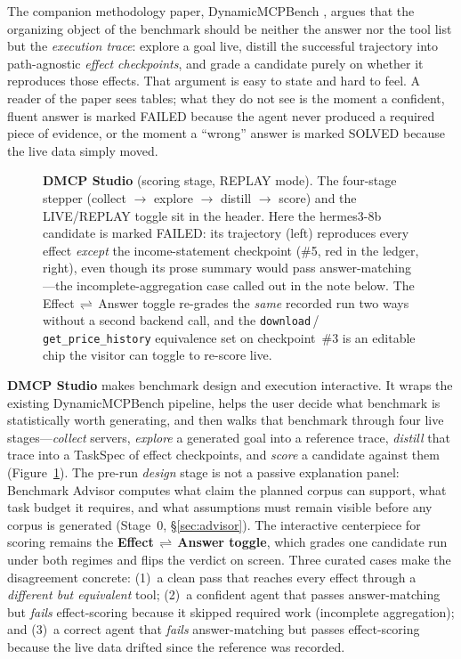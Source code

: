 \documentclass[11pt]{article}
\begin{document}
The companion methodology paper, DynamicMCPBench
\citep{dynamicmcpbench2026}, argues that the organizing object of the
benchmark should be neither the answer nor the tool list but the
\emph{execution trace}: explore a goal live, distill the successful
trajectory into path-agnostic \emph{effect checkpoints}, and grade a
candidate purely on whether it reproduces those effects. That argument is
easy to state and hard to feel. A reader of the paper sees tables; what they
do not see is the moment a confident, fluent answer is marked
\textsf{FAILED} because the agent never produced a required piece of
evidence, or the moment a ``wrong'' answer is marked \textsf{SOLVED} because
the live data simply moved.

\begin{figure}[t]
  \centering
  
  \caption{\textbf{DMCP Studio} (scoring stage, REPLAY mode). The four-stage
    stepper (collect $\rightarrow$ explore $\rightarrow$ distill $\rightarrow$
    score) and the LIVE/REPLAY toggle sit in the header. Here the
    \textsf{hermes3-8b} candidate is marked \textsf{FAILED}: its trajectory
    (left) reproduces every effect \emph{except} the income-statement
    checkpoint (\#5, red in the ledger, right), even though its prose summary
    would pass answer-matching---the incomplete-aggregation case called out in
    the note below. The Effect\,$\rightleftharpoons$\,Answer toggle re-grades
    the \emph{same} recorded run two ways without a second backend call, and the
    \texttt{download}\,/\,\texttt{get\_price\_history} equivalence set on
    checkpoint~\#3 is an editable chip the visitor can toggle to re-score live.}
  \label{fig:studio}
\end{figure}

\textbf{DMCP Studio} makes benchmark design and execution interactive. It wraps
the existing DynamicMCPBench pipeline, helps the user decide what benchmark is
statistically worth generating, and then walks that benchmark through four live
stages---\emph{collect} servers, \emph{explore} a generated goal into a
reference trace, \emph{distill} that trace into a TaskSpec of effect
checkpoints, and \emph{score} a candidate against them
(Figure~\ref{fig:studio}). The pre-run \emph{design} stage is not a passive
explanation panel: Benchmark Advisor computes what claim the planned corpus can
support, what task budget it requires, and what assumptions must remain visible
before any corpus is generated (Stage~0, \S\ref{sec:advisor}). The interactive
centerpiece for scoring remains the
\textbf{Effect\,$\rightleftharpoons$\,Answer toggle}, which grades one
candidate run under both regimes and flips the verdict on screen. Three curated
cases make the disagreement concrete: (1)~a clean pass that reaches every effect
through a \emph{different but equivalent} tool; (2)~a confident agent that
passes answer-matching but \emph{fails} effect-scoring because it skipped
required work (incomplete aggregation); and (3)~a correct agent that
\emph{fails} answer-matching but passes effect-scoring because the live data
drifted since the reference was recorded.
\end{document}
